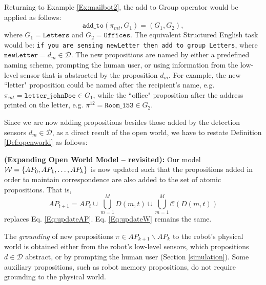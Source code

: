 Returning to Example \ref{Ex:mailbot2}, the add to Group operator would be applied as follows: 
$$ \texttt{add\_to}(\pi_{mt}, G_1) = (G_1, G_2),$$
where $G_1 = \texttt{Letters}$ and $G_2 = \texttt{Offices}$.
The equivalent Structured English task would be: \texttt{if you are sensing newLetter then add to group Letters}, where $\texttt{newLetter} = d_m \in \mathcal{D}$. The new propositions are named by either a predefined naming scheme, prompting the human user, or using information from the low-level sensor that is abstracted by the proposition $d_m$. For example, the new ``letter" proposition could be named after the recipient's name, e.g. $\pi_{mt} = \texttt{letter\_johnDoe} \in G_1$, while the ``office" proposition after the address printed on the letter, e.g. $ \pi^{12} = \texttt{Room\_153} \in G_2$.

Since we are now adding propositions besides those added by the detection sensors $d_m \in \mathcal{D}$, as a direct result of the open world, we have to restate Definition \ref{Def:openworld} as follows:

\begin{myDefinition}\label{Def:openworld2}
	\textbf{(Expanding Open World Model -- revisited):} Our model $\mathcal{W} = \left\{ AP_0, AP_1, \ldots, AP_k \right\}$ is now updated such that the propositions added in order to maintain correspondence are also added to the set of atomic propositions. That is, 
	\begin{equation}\label{Eq:updateAP2}
		AP_{t+1} = AP_t \cup \bigcup_{m=1}^{M}D(m, t) \cup \bigcup_{m=1}^{M}\mathcal{C}(D(m, t))
	\end{equation}
	replaces Eq. \eqref{Eq:updateAP}. Eq. \eqref{Eq:updateW} remains the same.
\end{myDefinition}

\begin{myAssumption}\label{Ass:grounding}
	The \emph{grounding} \cite{Grounding2013} of new propositions $\pi \in AP_{k+1} \backslash AP_k$ to the robot's physical world is obtained either from the robot's low-level sensors, which propositions $d \in \mathcal{D}$ abstract, or by prompting the human user (Section \ref{simulation}).
Some auxiliary propositions, such as robot memory propositions, do not require grounding to the physical world.
\end{myAssumption}

